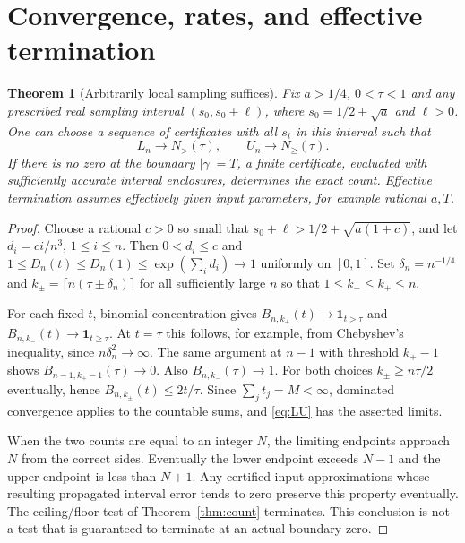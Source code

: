 \documentclass[11pt]{article}
\newtheorem{theorem}{Theorem}[section]
\theoremstyle{remark}\newtheorem{remark}[theorem]{Remark}
\newcommand{\one}{\mathbf 1}
\begin{document}
\section{Convergence, rates, and effective termination}
\begin{theorem}[Arbitrarily local sampling suffices]\label{thm:convergence}
Fix $a>1/4$, $0<\tau<1$ and any prescribed real sampling interval $(s_0,s_0+\ell)$, where $s_0=1/2+\sqrt a$ and $\ell>0$. One can choose a sequence of certificates with all $s_i$ in this interval such that
\[
 L_n\longrightarrow N_>(\tau),\qquad U_n\longrightarrow N_\ge(\tau).
\]
If there is no zero at the boundary $|\gamma|=T$, a finite certificate, evaluated with sufficiently accurate interval enclosures, determines the exact count. Effective termination assumes effectively given input parameters, for example rational $a,T$.
\end{theorem}
\begin{proof}
Choose a rational $c>0$ so small that $s_0+\ell>1/2+\sqrt{a(1+c)}$, and let $d_i=c i/n^3$, $1\le i\le n$. Then $0<d_i\le c$ and $1\le D_n(t)\le D_n(1)\le\exp(\sum_i d_i)\to1$ uniformly on $[0,1]$. Set $\delta_n=n^{-1/4}$ and $k_\pm=\lceil n(\tau\pm\delta_n)\rceil$ for all sufficiently large $n$ so that $1\le k_-\le k_+\le n$.

For each fixed $t$, binomial concentration gives $B_{n,k_+}(t)\to\one_{t>\tau}$ and $B_{n,k_-}(t)\to\one_{t\ge\tau}$. At $t=\tau$ this follows, for example, from Chebyshev's inequality, since $n\delta_n^2\to\infty$. The same argument at $n-1$ with threshold $k_+-1$ shows $B_{n-1,k_+-1}(\tau)\to0$. Also $B_{n,k_-}(\tau)\to1$. For both choices $k_\pm\ge n\tau/2$ eventually, hence $B_{n,k_\pm}(t)\le2t/\tau$. Since $\sum_jt_j=M<\infty$, dominated convergence applies to the countable sums, and \eqref{eq:LU} has the asserted limits.

When the two counts are equal to an integer $N$, the limiting endpoints approach $N$ from the correct sides. Eventually the lower endpoint exceeds $N-1$ and the upper endpoint is less than $N+1$. Any certified input approximations whose resulting propagated interval error tends to zero preserve this property eventually. The ceiling/floor test of Theorem~\ref{thm:count} terminates. This conclusion is not a test that is guaranteed to terminate at an actual boundary zero.
\end{proof}
\end{document}
